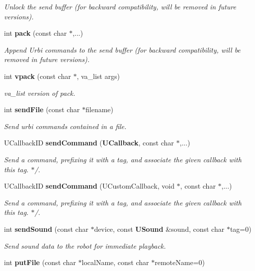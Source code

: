 \begin{CompactItemize}
\begin{CompactList}\small\item\em Unlock the send buffer (for backward compatibility, will be removed in future versions). \item\end{CompactList}\item 
int {\bf pack} (const char $\ast$,...)
\begin{CompactList}\small\item\em Append Urbi commands to the send buffer (for backward compatibility, will be removed in future versions). \item\end{CompactList}\item 
int {\bf vpack} (const char $\ast$, va\_\-list args)\label{classUAbstractClient_a10}

\begin{CompactList}\small\item\em va\_\-list version of pack. \item\end{CompactList}\item 
int {\bf send\-File} (const char $\ast$filename)\label{classUAbstractClient_a11}

\begin{CompactList}\small\item\em Send urbi commands contained in a file. \item\end{CompactList}\item 
UCallback\-ID {\bf send\-Command} ({\bf UCallback}, const char $\ast$,...)\label{classUAbstractClient_a12}

\begin{CompactList}\small\item\em Send a command, prefixing it with a tag, and associate the given callback with this tag. $\ast$/. \item\end{CompactList}\item 
UCallback\-ID {\bf send\-Command} (UCustom\-Callback, void $\ast$, const char $\ast$,...)\label{classUAbstractClient_a13}

\begin{CompactList}\small\item\em Send a command, prefixing it with a tag, and associate the given callback with this tag. $\ast$/. \item\end{CompactList}\item 
int {\bf send\-Sound} (const char $\ast$device, const {\bf USound} \&sound, const char $\ast$tag=0)
\begin{CompactList}\small\item\em Send sound data to the robot for immediate playback. \item\end{CompactList}\item 
int {\bf put\-File} (const char $\ast$local\-Name, const char $\ast$remote\-Name=0)\label{classUAbstractClient_a15}


\end{CompactItemize}

